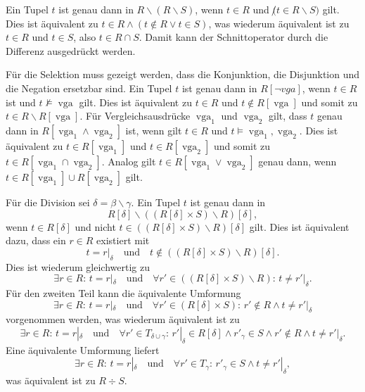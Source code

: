 \documentclass[12pt,a4paper]{amsart}
\DeclareMathOperator{\vga}{vga}
\begin{document}
\medskip

Ein Tupel $t$ ist genau dann in $R\backslash (R\backslash S)$, wenn $t\in R$ und $\not(t\in R\backslash S)$ gilt. Dies ist äquivalent zu $t\in R\land (t\not\in R\lor t\in S)$,
was wiederum äquivalent ist zu $t\in R$ und $t\in S$, also $t\in R\cap S$. Damit kann der Schnittoperator durch die Differenz ausgedrückt werden.

\medskip

Für die Selektion muss gezeigt werden, dass die Konjunktion, die Disjunktion und die Negation ersetzbar sind. Ein Tupel $t$ ist genau dann in $R[\lnot vga]$, wenn
$t\in R$ ist und $t\not\models\vga$ gilt. Dies ist äquivalent zu $t\in R$ und $t\not\in R[\vga]$ und somit zu $t\in R\backslash R[\vga]$. Für Vergleichsausdrücke $\vga_1$ und $\vga_2$ gilt, dass $t$ genau dann in $R[\vga_1\land \vga_2]$ ist, wenn gilt $t\in R$ und $t\models \vga_1,\vga_2$. Dies ist äquivalent zu $t\in R[\vga_1]$ und $t\in R[\vga_2]$ und somit zu $t\in R[\vga_1\cap\vga_2]$. Analog gilt $t\in R[\vga_1\lor\vga_2]$ genau dann, wenn $t\in R[\vga_1]\cup R[\vga_2]$ gilt.

\medskip

Für die Division sei $\delta=\beta\backslash\gamma$. Ein Tupel $t$ ist genau dann in 
\[
R[\delta]\backslash((R[\delta]\times S)\backslash R)[\delta],
\]
wenn $t\in R[\delta]$ und nicht $t\in ((R[\delta]\times S)\backslash R)[\delta]$ gilt. Dies ist äquivalent dazu, dass ein $r\in R$ existiert mit 
\[
t=r|_{\delta}\quad\mbox{und}\quad t\not\in ((R[\delta]\times S)\backslash R)[\delta].
\]
Dies ist wiederum gleichwertig zu 
\[
\exists r\in R:\,t=r|_{\delta}\quad\mbox{und}\quad\forall r'\in ((R[\delta]\times S)\backslash R):\, t\neq r'|_{\delta}.
\]
Für den zweiten Teil kann die äquivalente Umformung
\[
\exists r\in R:\,t=r|_{\delta}\quad\mbox{und}\quad\forall r'\in (R[\delta]\times S):\, r'\not\in R\land t\neq r'|_{\delta}
\]
vorgenommen werden, was wiederum äquivalent ist zu
\[
\exists r\in R:\,t=r|_{\delta}\quad\mbox{und}\quad\forall r'\in T_{\delta\cup\gamma}:\, r'|_{\delta}\in R[\delta]\land r'_{\gamma}\in S\land r'\not\in R\land t\neq r'|_{\delta}.
\]
Eine äquivalente Umformung liefert
\[
\exists r\in R:\,t=r|_{\delta}\quad\mbox{und}\quad\forall r'\in T_{\gamma}:\, r'_{\gamma}\in S\land t\neq r'|_{\delta},
\]
was äquivalent ist zu $R\div S$.

\medskip
\end{document}
